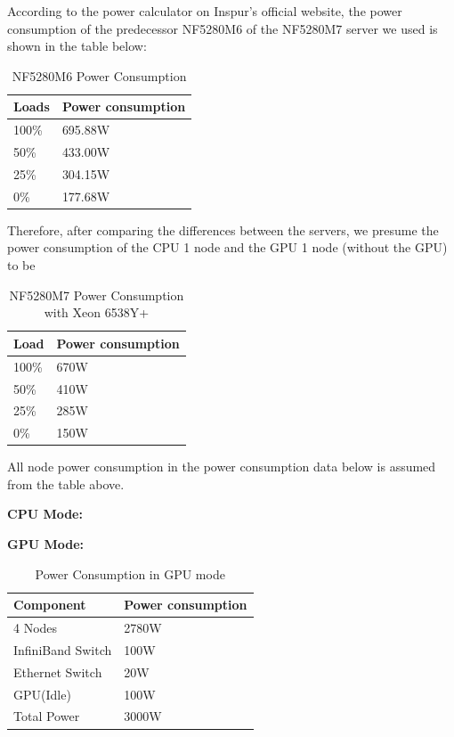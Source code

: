 \documentclass[a4paper,12pt]{article}
\begin{document}
According to the power calculator on Inspur's official website, the power consumption of the predecessor NF5280M6 of the NF5280M7 server we used is shown in the table below:
\begin{table}[H]
\centering
\caption{NF5280M6 Power Consumption}
\vspace{0.5cm}
\begin{tabular}{|l|l|}
\toprule
Loads & Power consumption \\
\midrule
100\% & 695.88W \\
\hline
50\% & 433.00W \\
\hline
25\% & 304.15W \\
\hline
0\% & 177.68W \\
\bottomrule
\end{tabular}
\end{table}

Therefore, after comparing the differences between the servers, we presume the power consumption of the CPU 1 node and the GPU 1 node (without the GPU) to be
\begin{table}[H]
\centering
\caption{NF5280M7 Power Consumption with Xeon 6538Y+}
\vspace{0.5cm}
\begin{tabular}{|l|l|}
\toprule
Load & Power consumption \\
\midrule
100\% & 670W \\
\hline
50\% & 410W \\
\hline
25\% & 285W \\
\hline
0\% & 150W \\
\bottomrule
\end{tabular}
\end{table}

All node power consumption in the power consumption data below is assumed from the table above.

\textbf{CPU Mode:}

\textbf{GPU Mode:}
\begin{table}[H]
\centering
\caption{Power Consumption in GPU mode}
\vspace{0.5cm}
\begin{tabular}{|l|l|}
\toprule
Component & Power consumption \\
\midrule
4 Nodes & 2780W \\
\hline
InfiniBand Switch & 100W \\
\hline
Ethernet Switch & 20W \\
\hline
GPU(Idle) & 100W \\
\hline
Total Power & 3000W \\
\bottomrule
\end{tabular}
\end{table}
\end{document}
